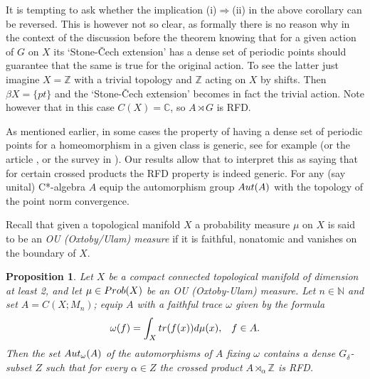 \documentclass[11 pt, leqno, hidelinks]{amsart}%
\theoremstyle{plain}
\newtheorem{proposition}[theorem]{Proposition}
\numberwithin{equation}{section}
\newcommand{\N}{\mathbb{N}}
\newcommand{\Z}{\mathbb{Z}}
\begin{document}
It is tempting to ask whether the implication (i)$\Longrightarrow$(ii) in the above corollary can be reversed. This is however not so clear, as formally there is no reason why in the context of the discussion before the theorem knowing that for a given action of $G$ on $X$ its `Stone-\v{C}ech extension' has a dense set of periodic points should guarantee that the same is true for the original action. To see the latter just imagine $X=\Z$ with a trivial topology and $\Z$ acting on $X$ by shifts. Then $\beta X = \{pt\}$ and the `Stone-\v{C}ech extension' becomes in fact the trivial action. Note however that
in this case $C(X) = \mathbb C$, so  $A \rtimes G$ is RFD.

\bigskip

As mentioned earlier, in some cases the property of having a dense set of periodic points for a  homeomorphism in a given class is generic, see for example \cite{DF} (or the article \cite{AHK}, or the survey in \cite{Bhishan}). Our results allow that to interpret this as saying that for certain crossed products
the RFD property is indeed generic. For any (say unital) C*-algebra $A$ equip the automorphism group $\textup{Aut}(A)$ with the topology of the point norm convergence.

Recall that given a topological manifold $X$ a probability measure $\mu$ on $X$ is said to be an \emph{OU (Oxtoby/Ulam) measure} if it is faithful, nonatomic and vanishes on the boundary of $X$.

\begin{proposition}\label{prop:generic}
	Let $X$ be a compact connected topological manifold of dimension at least 2, and let $\mu \in \textup{Prob}(X)$ be an OU (Oxtoby-Ulam) measure. Let $n \in \N$ and set $A= C(X;M_n)$; equip $A$ with a faithful trace $\omega$ given by the formula
	\[ \omega (f) = \int_X \textup{tr}(f(x)) d\mu(x), \;\;\; f \in A.\]
	Then the set $\textup{Aut}_\omega(A)$ of the automorphisms  of $A$ fixing $\omega$ contains a dense $G_\delta$-subset $Z$ such that for every $\alpha \in Z$ the crossed product $A \rtimes_\alpha \Z$ is RFD.   	
\end{proposition}
\end{document}
